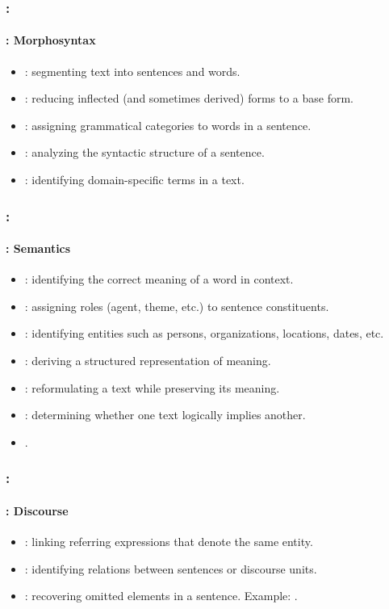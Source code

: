 \documentclass[xcolor=table]{beamer}
\begin{document}
\begin{frame}
	\frametitle{\insertshortsubtitle: \insertsection}
	\framesubtitle{\insertsubsection: Morphosyntax}

	\begin{itemize}
		\item {}: segmenting text into sentences and words.
		\item {}: reducing inflected (and sometimes derived) forms to a base form.
		\item {}: assigning grammatical categories to words in a sentence.
		\item {}: analyzing the syntactic structure of a sentence.
		\item {}: identifying domain-specific terms in a text.
	\end{itemize}

\end{frame}

\begin{frame}
	\frametitle{\insertshortsubtitle: \insertsection}
	\framesubtitle{\insertsubsection: Semantics}

	\begin{itemize}
		\item {}: identifying the correct meaning of a word in context.
		\item {}: assigning roles (agent, theme, etc.) to sentence constituents.
		\item {}: identifying entities such as persons, organizations, locations, dates, etc.
		\item {}: deriving a structured representation of meaning.
		\item {}: reformulating a text while preserving its meaning.
		\item {}: determining whether one text logically implies another.
		\item {}.
	\end{itemize}

\end{frame}

\begin{frame}
	\frametitle{\insertshortsubtitle: \insertsection}
	\framesubtitle{\insertsubsection: Discourse}

	\begin{itemize}
		\item {}: linking referring expressions that denote the same entity.
		\item {}: identifying relations between sentences or discourse units.
		\item {}: recovering omitted elements in a sentence.
		Example: .
	\end{itemize}

\end{frame}
\end{document}
